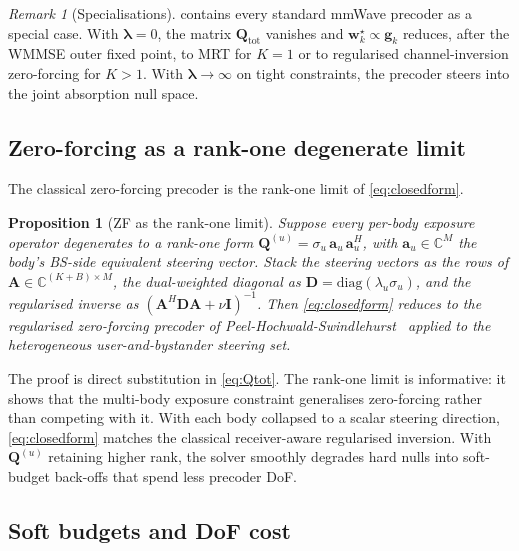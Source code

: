 \documentclass[journal,twocolumn,10pt]{IEEEtran}
\theoremstyle{plain}
\newtheorem{proposition}[theorem]{Proposition}
\theoremstyle{remark}
\newtheorem{remark}[theorem]{Remark}
\newcommand{\ww}{\mathbf{w}}
\newcommand{\gvec}{\mathbf{g}}
\newcommand{\Qmat}{\mathbf{Q}}
\newcommand{\Complex}{\mathbb{C}}
\begin{document}
\begin{remark}[Specialisations]\label{rem:limits}
 contains every standard mmWave precoder as a
special case. With $\bm\lambda = 0$, the matrix
$\Qmat_{\mathrm{tot}}$ vanishes and $\ww_k^\star \propto \gvec_k$
reduces, after the WMMSE outer fixed point, to MRT for $K = 1$ or to
regularised channel-inversion zero-forcing for $K > 1$. With
$\bm\lambda \to \infty$ on tight constraints, the precoder steers
into the joint absorption null space.
\end{remark}

\subsection{Zero-forcing as a rank-one degenerate limit}

The classical zero-forcing precoder is the rank-one limit of
\cref{eq:closedform}.

\begin{proposition}[ZF as the rank-one limit]\label{prop:ZFlimit}
Suppose every per-body exposure operator degenerates to a rank-one
form $\Qmat^{(u)} = \sigma_u\,\mathbf{a}_u\,\mathbf{a}_u^H$, with
$\mathbf{a}_u \in \Complex^M$ the body's BS-side equivalent steering
vector. Stack the steering vectors as the rows of $\mathbf{A}
\in \Complex^{(K+B)\times M}$, the dual-weighted diagonal as
$\mathbf{D} = \mathrm{diag}(\lambda_u \sigma_u)$, and the regularised
inverse as $(\mathbf{A}^H \mathbf{D} \mathbf{A} + \nu \mathbf{I})^{-1}$.
Then \cref{eq:closedform} reduces to the regularised zero-forcing
precoder of Peel-Hochwald-Swindlehurst~\cite{PeelHochwald2005}
applied to the heterogeneous user-and-bystander steering set.
\end{proposition}

The proof is direct substitution in \cref{eq:Qtot}. The rank-one
limit is informative: it shows that the multi-body exposure
constraint generalises zero-forcing rather than competing with it.
With each body collapsed to a scalar steering direction,
\cref{eq:closedform} matches the classical receiver-aware
regularised inversion. With $\Qmat^{(u)}$ retaining higher rank, the
solver smoothly degrades hard nulls into soft-budget back-offs that
spend less precoder DoF.

\subsection{Soft budgets and DoF cost}\label{sec:softbudget}
\end{document}
